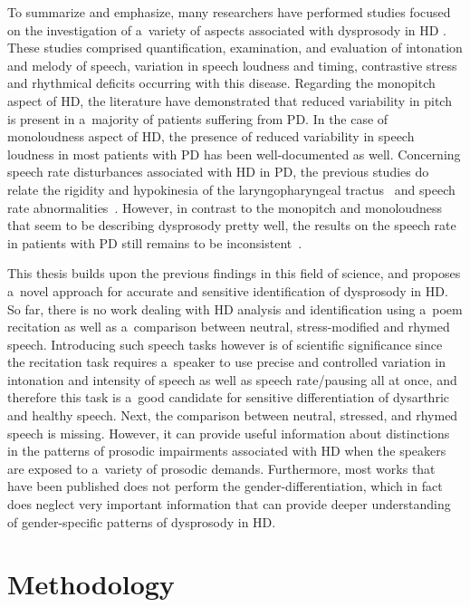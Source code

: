 To summarize and emphasize, many researchers have performed studies focused on the investigation of a~variety of aspects associated with dysprosody in HD \cite{Canter1963, Metter1986, Caekebeke1991, Flint1992, Goberman2005b, Adams2009, Skodda2008, Rusz2011, Rusz2011b, Skodda2011c, Joan2015}. These studies comprised quantification, examination, and evaluation of intonation and melody of speech, variation in speech loudness and timing, contrastive stress and rhythmical deficits occurring with this disease. Regarding the monopitch aspect of HD, the literature have demonstrated that reduced variability in pitch is present in a~majority of patients suffering from PD. In the case of monoloudness aspect of HD, the presence of reduced variability in speech loudness in most patients with PD has been well-documented as well. Concerning speech rate disturbances associated with HD in PD, the previous studies do relate the rigidity and hypokinesia of the laryngopharyngeal tractus~\cite{Baker1998} and speech rate abnormalities~\cite{Skodda2009, Skodda2011b, Skodda2011c}. However, in contrast to the monopitch and monoloudness that seem to be describing dysprosody pretty well, the results on the speech rate in patients with PD still remains to be inconsistent~\cite{Caligiuri1989, Flint1992, Ackermann1997}.

This thesis builds upon the previous findings in this field of science, and proposes a~novel approach for accurate and sensitive identification of dysprosody in HD. So far, there is no work dealing with HD analysis and identification using a~poem recitation as well as a~comparison between neutral, stress-modified and rhymed speech. Introducing such speech tasks however is of scientific significance since the recitation task requires a~speaker to use precise and controlled variation in intonation and intensity of speech as well as speech rate/pausing all at once, and therefore this task is a~good candidate for sensitive differentiation of dysarthric and healthy speech. Next, the comparison between neutral, stressed, and rhymed speech is missing. However, it can provide useful information about distinctions in the patterns of prosodic impairments associated with HD when the speakers are exposed to a~variety of prosodic demands. Furthermore, most works that have been published does not perform the gender-differentiation, which in fact does neglect very important information that can provide deeper understanding of gender-specific patterns of dysprosody in HD. 

\section{Methodology}
\label{ch4_3}


